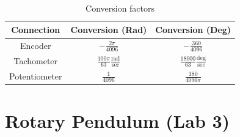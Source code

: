 \begin{table}[htbp]
    \centering
    \begin{tabular}{c c c }
        Connection    & Conversion (Rad)                                    & Conversion (Deg)                                   \\\bottomrule
        Encoder       & \(-\frac{2\pi}{4096}\)                              & \(-\frac{360}{4096}\)                              \\
        Tachometer    & \(\frac{100\pi}{63} \frac{\text{rad}}{\text{sec}}\) & \(\frac{18000}{63} \frac{\text{deg}}{\text{sec}}\) \\
        Potentiometer & \(\frac{1}{4096}\)                                  & \(\frac{180}{4096\pi}\)                            \\
    \end{tabular}
    \caption{Conversion factors}\label{tab:conversionFactors}
\end{table}

\section{Rotary Pendulum (Lab 3)}
